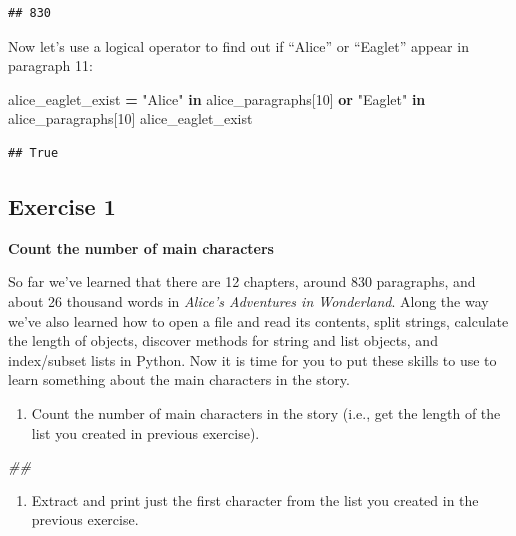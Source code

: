 \documentclass[
]{book}
\newenvironment{Shaded}{\begin{snugshade}}{\end{snugshade}}
\newcommand{\CommentTok}[1]{\textcolor[rgb]{0.56,0.35,0.01}{\textit{#1}}}
\newcommand{\DecValTok}[1]{\textcolor[rgb]{0.00,0.00,0.81}{#1}}
\newcommand{\KeywordTok}[1]{\textcolor[rgb]{0.13,0.29,0.53}{\textbf{#1}}}
\newcommand{\NormalTok}[1]{#1}
\newcommand{\OperatorTok}[1]{\textcolor[rgb]{0.81,0.36,0.00}{\textbf{#1}}}
\newcommand{\StringTok}[1]{\textcolor[rgb]{0.31,0.60,0.02}{#1}}
\providecommand{\tightlist}{%
  \setlength{\itemsep}{0pt}\setlength{\parskip}{0pt}}
\begin{document}
\begin{verbatim}
## 830
\end{verbatim}

Now let's use a logical operator to find out if ``Alice'' or ``Eaglet'' appear in paragraph 11:

\begin{Shaded}
\begin{Highlighting}[]
\NormalTok{alice\_eaglet\_exist }\OperatorTok{=} \StringTok{"Alice"} \KeywordTok{in}\NormalTok{ alice\_paragraphs[}\DecValTok{10}\NormalTok{] }\KeywordTok{or} \StringTok{"Eaglet"} \KeywordTok{in}\NormalTok{ alice\_paragraphs[}\DecValTok{10}\NormalTok{]}
\NormalTok{alice\_eaglet\_exist}
\end{Highlighting}
\end{Shaded}

\begin{verbatim}
## True
\end{verbatim}

\hypertarget{exercise-1-4}{%
\subsection{Exercise 1}\label{exercise-1-4}}

\textbf{Count the number of main characters}

So far we've learned that there are 12 chapters, around 830 paragraphs, and about 26 thousand words in \emph{Alice's Adventures in Wonderland}. Along the way we've also learned how to open a file and read its contents, split strings, calculate the length of objects, discover methods for string and list objects, and index/subset lists in Python. Now it is time for you to put these skills to use to learn something about the main characters in the story.

\begin{enumerate}
\def\labelenumi{\arabic{enumi}.}
\tightlist
\item
  Count the number of main characters in the story (i.e., get the length of the list you created in previous exercise).
\end{enumerate}

\begin{Shaded}
\begin{Highlighting}[]
\CommentTok{\#\#}
\end{Highlighting}
\end{Shaded}

\begin{enumerate}
\def\labelenumi{\arabic{enumi}.}
\setcounter{enumi}{1}
\tightlist
\item
  Extract and print just the first character from the list you created in the previous exercise.
\end{enumerate}
\end{document}
